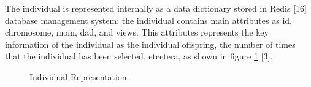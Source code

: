 The individual is represented internally as a data dictionary stored in Redis
[16] database management system; the individual contains main attributes as id,
chromosome, mom, dad, and views. This attributes represents the key information
of the individual as the individual offspring, the number of times that the
individual has been selected, etcetera, as shown in figure \ref{fig:individualRep} [3].

\begin{figure}
	\captionsetup{justification=centering,margin=2cm}
	\centering
	\setlength\fboxsep{0pt}
	\setlength\fboxrule{0.7pt}
	\caption{Individual Representation.}
	\label{fig:individualRep}
\end{figure}

